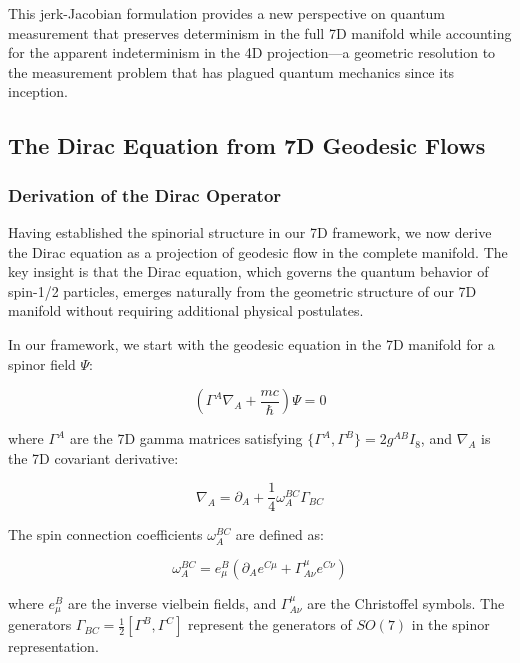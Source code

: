 \documentclass{article}
\begin{document}
This jerk-Jacobian formulation provides a new perspective on quantum measurement that preserves determinism in the full 7D manifold while accounting for the apparent indeterminism in the 4D projection—a geometric resolution to the measurement problem that has plagued quantum mechanics since its inception.

\subsection{The Dirac Equation from 7D Geodesic Flows}

\subsubsection{Derivation of the Dirac Operator}

Having established the spinorial structure in our 7D framework, we now derive the Dirac equation as a projection of geodesic flow in the complete manifold. The key insight is that the Dirac equation, which governs the quantum behavior of spin-1/2 particles, emerges naturally from the geometric structure of our 7D manifold without requiring additional physical postulates.

In our framework, we start with the geodesic equation in the 7D manifold for a spinor field $\Psi$:

\begin{equation}
\left(\Gamma^A \nabla_A + \frac{mc}{\hbar}\right) \Psi = 0
\end{equation}

where $\Gamma^A$ are the 7D gamma matrices satisfying $\{\Gamma^A, \Gamma^B\} = 2g^{AB}I_8$, and $\nabla_A$ is the 7D covariant derivative:

\begin{equation}
\nabla_A = \partial_A + \frac{1}{4}\omega_A^{BC}\Gamma_{BC}
\end{equation}

The spin connection coefficients $\omega_A^{BC}$ are defined as:

\begin{equation}
\omega_A^{BC} = e^B_\mu (\partial_A e^{C\mu} + \Gamma^\mu_{A\nu}e^{C\nu})
\end{equation}

where $e^B_\mu$ are the inverse vielbein fields, and $\Gamma^\mu_{A\nu}$ are the Christoffel symbols. The generators $\Gamma_{BC} = \frac{1}{2}[\Gamma^B, \Gamma^C]$ represent the generators of $SO(7)$ in the spinor representation.
\end{document}
